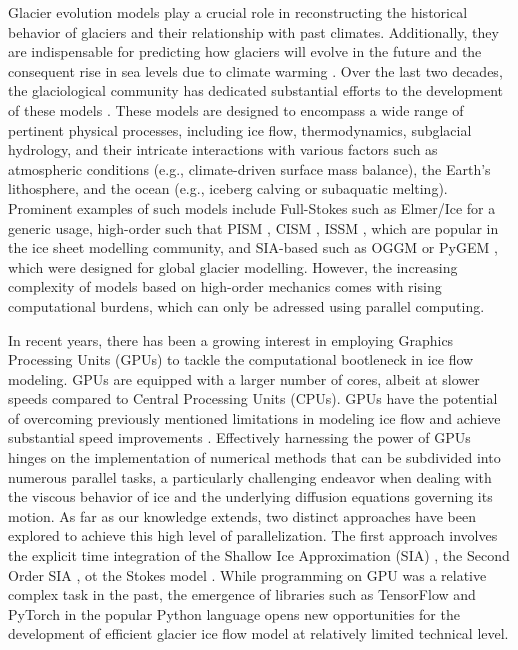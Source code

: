 \documentclass[10pt,twocolumn]{article}
\begin{document}
Glacier evolution models play a crucial role in reconstructing the historical behavior
of glaciers and their relationship with past climates. Additionally, they are indispensable 
for predicting how glaciers will evolve in the future and the consequent rise in sea levels
 due to climate warming \citep{pattyn2018paradigm}.
Over the last two decades, the glaciological community has dedicated substantial efforts to 
the development of these models \citep{zekollari2022ice}. 
These models are designed to encompass a wide range of 
pertinent physical processes, including ice flow, thermodynamics, subglacial hydrology, 
and their intricate interactions with various factors such as atmospheric conditions 
(e.g., climate-driven surface mass balance), the Earth's lithosphere, and the ocean 
(e.g., iceberg calving or subaquatic melting). Prominent examples of such models include 
Full-Stokes such as Elmer/Ice \citep{Gagliardini.etal.2013} for a generic
usage, high-order such that PISM \citep{Winkelmann2011}, CISM \citep{lipscomb2019description}, 
ISSM \citep{larour2012continental}, which are popular in the ice sheet modelling community,
and SIA-based such as OGGM \citep{maussion2019open} or PyGEM \citep{rounce2020glacier}, 
which were designed for global glacier modelling.
However, the increasing complexity of models based on high-order mechanics comes with 
rising computational burdens, which can only be adressed using parallel computing.

In recent years, there has been a growing interest in employing Graphics Processing Units 
(GPUs) to tackle the computational bootleneck in ice flow modeling. 
GPUs are equipped with a larger number of cores, albeit 
at slower speeds compared to Central Processing Units (CPUs). 
GPUs have the potential of overcoming previously mentioned limitations in modeling ice flow 
and achieve substantial speed improvements \citep{rass2020modelling}.
Effectively harnessing the power of GPUs hinges on the implementation of numerical methods 
that can be subdivided into numerous parallel tasks, a particularly challenging endeavor 
when dealing with the viscous behavior of ice and the underlying diffusion equations 
governing its motion. As far as our knowledge extends, two distinct approaches have
been explored to achieve this high level of parallelization. The first approach 
involves the explicit time integration of the Shallow Ice Approximation (SIA) 
\citep{vivsnjevic2020climatic}, the Second Order SIA \citep{braedstrup2014ice},
ot the Stokes model \citep{rass2020modelling}.
While programming on GPU was a relative complex task in the past, the emergence of libraries 
such as TensorFlow and PyTorch in the popular Python language opens new opportunities
for the development of efficient glacier ice flow model at relatively limited technical level.
 
\end{document}
